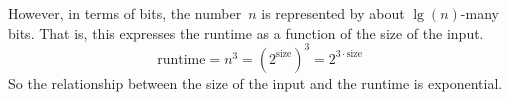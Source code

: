 \documentclass[answers, nolegalese, 11pt]{examjh}
\begin{document}
\begin{questions}
\begin{solution}
However, in terms of bits,
the number~$n$ is represented by about $\lg(n)$-many bits.
That is, this expresses the runtime as a function of 
the size of the input.
\begin{equation*}
   \text{runtime}=n^3=(2^{\text{size}})^3=2^{3\cdot\text{size}}
\end{equation*}
So the relationship between the size of the input
and the runtime is exponential.
\end{solution}

\end{questions}
\end{document}
